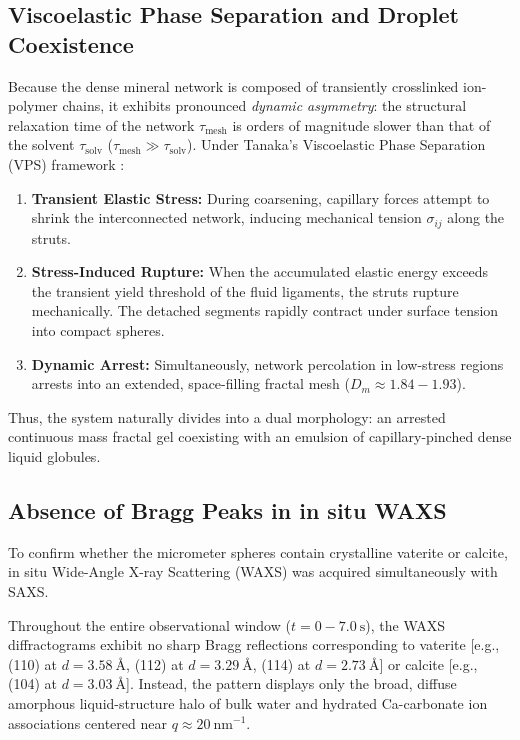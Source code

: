 \documentclass[11pt,a4paper]{article}
\begin{document}
\subsection{Viscoelastic Phase Separation and Droplet Coexistence}

Because the dense mineral network is composed of transiently crosslinked ion-polymer chains, it exhibits pronounced \emph{dynamic asymmetry}: the structural relaxation time of the network $\tau_{\mathrm{mesh}}$ is orders of magnitude slower than that of the solvent $\tau_{\mathrm{solv}}$ ($\tau_{\mathrm{mesh}} \gg \tau_{\mathrm{solv}}$). Under Tanaka's Viscoelastic Phase Separation (VPS) framework \cite{tanaka2000viscoelastic, tanaka2001viscoelastic}:
\begin{enumerate}
    \item \textbf{Transient Elastic Stress:} During coarsening, capillary forces attempt to shrink the interconnected network, inducing mechanical tension $\sigma_{ij}$ along the struts.
    \item \textbf{Stress-Induced Rupture:} When the accumulated elastic energy exceeds the transient yield threshold of the fluid ligaments, the struts rupture mechanically. The detached segments rapidly contract under surface tension into compact spheres.
    \item \textbf{Dynamic Arrest:} Simultaneously, network percolation in low-stress regions arrests into an extended, space-filling fractal mesh ($D_m \approx 1.84 - 1.93$).
\end{enumerate}

Thus, the system naturally divides into a dual morphology: an arrested continuous mass fractal gel coexisting with an emulsion of capillary-pinched dense liquid globules.

\subsection{Absence of Bragg Peaks in in situ WAXS}

To confirm whether the micrometer spheres contain crystalline vaterite or calcite, in situ Wide-Angle X-ray Scattering (WAXS) was acquired simultaneously with SAXS. 

Throughout the entire observational window ($t = 0 - 7.0\ \mathrm{s}$), the WAXS diffractograms exhibit no sharp Bragg reflections corresponding to vaterite [e.g., (110) at $d = 3.58\ \text{\AA}$, (112) at $d = 3.29\ \text{\AA}$, (114) at $d = 2.73\ \text{\AA}$] or calcite [e.g., (104) at $d = 3.03\ \text{\AA}$]. Instead, the pattern displays only the broad, diffuse amorphous liquid-structure halo of bulk water and hydrated Ca-carbonate ion associations centered near $q \approx 20\ \mathrm{nm}^{-1}$. 
\end{document}
